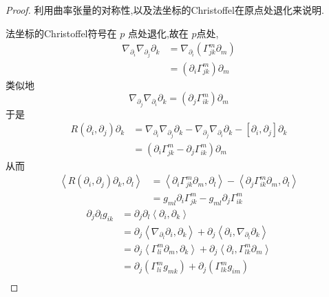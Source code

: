 \documentclass[../../几何与拓扑.tex]{subfiles}
\begin{document}
\begin{proof}

    利用曲率张量的对称性,以及法坐标的Christoffel在原点处退化来说明.


    法坐标的Christoffel符号在 \(  p  \)  点处退化,故在 \(  p  \)点处, 
    \[
    \begin{aligned}
      \nabla _{\partial _{i}} \nabla _{\partial _{j}}\partial _{k}& =    \nabla _{\partial _{i}} \left(  \Gamma _{jk}^{m} \partial _{m}\right) \\ 
       & = \left(  \partial _{i} \Gamma _{jk}^{m} \right)\partial _{m} 
    \end{aligned}
    \]类似地 \[
     \nabla _{\partial _{j}} \nabla _{\partial _{i}} \partial _{k}=  \left( \partial _{j} \Gamma _{ik}^{m} \right)\partial _{m} 
    \]于是
    \[
  \begin{aligned}
    R\left( \partial _{i},\partial _{j} \right)\partial _{k}& =  \nabla _{\partial _{i}}  \nabla _{\partial _{j}}\partial _{k}- \nabla _{\partial _{j}} \nabla _{\partial _{i}}\partial _{k}-\left[ \partial _{i},\partial _{j} \right]\partial _{k} \\ 
     & =  \left( \partial _{i} \Gamma _{jk}^{m}-\partial _{j} \Gamma _{ik}^{m} \right)\partial _{m} 
  \end{aligned}
    \]从而 \[
        \begin{aligned}
        \left<R\left( \partial _{i},\partial _{j} \right)\partial _{k},\partial _{l}  \right>& = \left<\partial _{i} \Gamma _{jk}^{m}\partial _{m},\partial _{l} \right>-\left<\partial _{j} \Gamma _{ik}^{m}\partial _{m},\partial _{l} \right>\\ 
         & =  g_{ml}\partial _{i} \Gamma _{jk}^{m}- g_{ml}\partial _{j} \Gamma _{ik}^{m}
        \end{aligned}
        \]
  \[
 \begin{aligned}
    \partial _{j}\partial _{l}g_{ik}& =  \partial _{j}\partial _{l}\left<\partial _{i},\partial _{k} \right>\\ 
     & = \partial _{j} \left< \nabla _{\partial _{l}}\partial _{i},\partial _{k} \right>+ \partial _{j}\left<\partial _{i}, \nabla _{\partial _{l}}\partial _{k} \right>\\ 
      & =  \partial _{j}\left< \Gamma _{li}^{m}\partial _{m},\partial _{k} \right>+ \partial _{j}\left<\partial _{i}, \Gamma _{lk}^{m}\partial _{m} \right>\\ 
       & = \partial _{j}\left(  \Gamma _{li}^{m}g_{m k} \right)+  \partial _{j} \left(  \Gamma _{lk}^{m} g_{im} \right)\\ 

\end{aligned}\]
\end{proof}
\end{document}
